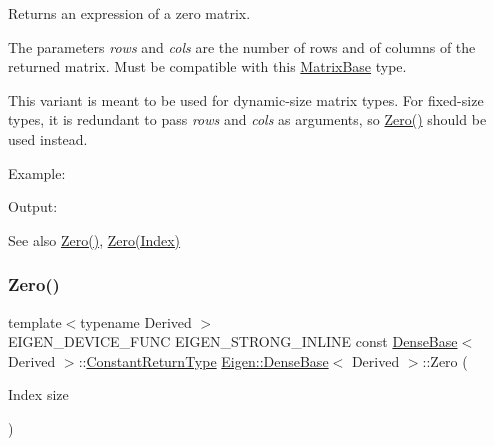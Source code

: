 \begin{DoxyReturn}{Returns}
an expression of a zero matrix.
\end{DoxyReturn}
The parameters {\itshape rows} and {\itshape cols} are the number of rows and of columns of the returned matrix. Must be compatible with this \mbox{\hyperlink{class_eigen_1_1_matrix_base}{Matrix\+Base}} type.

This variant is meant to be used for dynamic-\/size matrix types. For fixed-\/size types, it is redundant to pass {\itshape rows} and {\itshape cols} as arguments, so \mbox{\hyperlink{class_eigen_1_1_dense_base_a8c4be762b10041d64a2b2ce85bb14ba0}{Zero()}} should be used instead.

Example\+: 
\begin{DoxyCodeInclude}{0}
\end{DoxyCodeInclude}
 Output\+: 
\begin{DoxyVerbInclude}
\end{DoxyVerbInclude}


\begin{DoxySeeAlso}{See also}
\mbox{\hyperlink{class_eigen_1_1_dense_base_a8c4be762b10041d64a2b2ce85bb14ba0}{Zero()}}, \mbox{\hyperlink{class_eigen_1_1_dense_base_a55794ebb0c1cba3b998063a45b18378c}{Zero(\+Index)}} 
\end{DoxySeeAlso}
\mbox{\label{class_eigen_1_1_dense_base_a55794ebb0c1cba3b998063a45b18378c}} 
\subsubsection{\texorpdfstring{Zero()}{Zero()}\hspace{0.1cm}{\footnotesize\ttfamily [2/3]}}
{\footnotesize\ttfamily template$<$typename Derived $>$ \\
E\+I\+G\+E\+N\+\_\+\+D\+E\+V\+I\+C\+E\+\_\+\+F\+U\+NC E\+I\+G\+E\+N\+\_\+\+S\+T\+R\+O\+N\+G\+\_\+\+I\+N\+L\+I\+NE const \mbox{\hyperlink{class_eigen_1_1_dense_base}{Dense\+Base}}$<$ Derived $>$\+::\mbox{\hyperlink{class_eigen_1_1_cwise_nullary_op}{Constant\+Return\+Type}} \mbox{\hyperlink{class_eigen_1_1_dense_base}{Eigen\+::\+Dense\+Base}}$<$ Derived $>$\+::Zero (\begin{DoxyParamCaption}\item[{Index}]{size }\end{DoxyParamCaption})\hspace{0.3cm}{\ttfamily [static]}}


